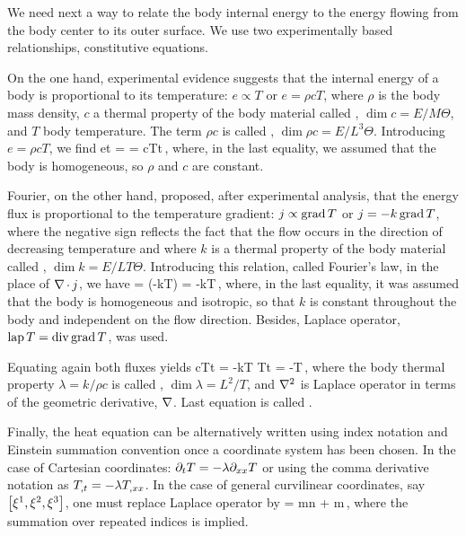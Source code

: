 We need next a way to relate the body internal energy to the energy flowing from the body center to its outer surface. We use two experimentally based relationships, \aka constitutive equations. 

On the one hand, experimental evidence suggests that the internal energy of a body is proportional to its temperature: $e\propto T$ or $e = \rho c T$, where $\rho$ is the body mass density, $c$ a thermal property of the body material called , $\dim c = E/M\Theta$, and $T$ body temperature. The term $\rho c$ is called , $\dim\rho c = E/L^3\Theta$. Introducing $e = \rho c T$, we find
\beq
\xpd et =  = \rho c\xpd Tt\,,
\eeq
where, in the last equality, we assumed that the body is homogeneous, so $\rho$ and $c$ are constant.

Fourier, on the other hand, proposed, after experimental analysis, that the energy flux is proportional to the temperature gradient: $j\propto\operatorname{grad} T$ or $j = -k\operatorname{grad} T$, where the negative sign reflects the fact that the flow occurs in the direction of decreasing temperature and where $k$ is a thermal property of the body material called , $\dim k = E/LT\Theta$. Introducing this relation, called Fourier's law, in the place of $\nabla\operatorname{\cdot}j$, we have
\beq
\div\flux = \div\left(-k\grad T\right)
                 = -k\lap T\,,
\eeq
where, in the last equality, it was assumed that the body is homogeneous and isotropic, so that $k$ is constant throughout the body and independent on the flow direction. Besides, Laplace operator, $\operatorname{lap} T = \operatorname{div}\operatorname{grad} T$, was used.

Equating again both fluxes yields
\beq
\rho c\xpd Tt = -k\lap T \implies
      \xpd Tt = -\lambda\lder T\,,
\eeq
where the body thermal property $\lambda = k/\rho c$ is called , $\dim\lambda = L^2/T$, and $\nabla^2$ is Laplace operator in terms of the geometric derivative, $\nabla$. Last equation is called .

Finally, the heat equation can be alternatively written using index notation and Einstein summation convention once a coordinate system has been chosen. In the case of Cartesian coordinates: $\partial_{t}T = -\lambda\partial_{xx} T$ or using the comma derivative notation as ${T}_{,{t}} = -\lambda{T}_{,{xx}}$. In the case of general curvilinear coordinates, say $\left[{{\xi}^{1}, {\xi}^{2}, {\xi}^{3}}\right]$, one must replace Laplace operator by
\beq
\lder = \gder\cntens\xi m\iprod \gder\cntens\xi n
        + \lder\cntens\xi m\,,
\eeq
where the summation over repeated indices is implied.


